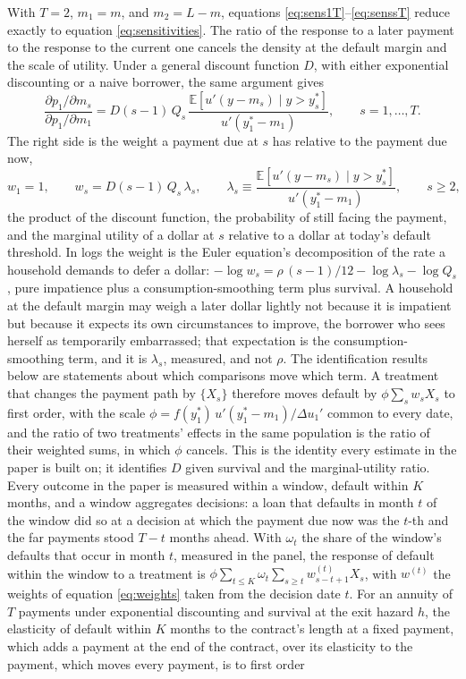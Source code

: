 With $T = 2$, $m_1 = m$, and $m_2 = L - m$, equations \eqref{eq:sens1T}--\eqref{eq:senssT} reduce exactly to equation \eqref{eq:sensitivities}. The ratio of the response to a later payment to the response to the current one cancels the density at the default margin and the scale of utility. Under a general discount function $D$, with either exponential discounting or a naive borrower, the same argument gives
\begin{equation}\label{eq:curveT}
\frac{\partial p_1/\partial m_s}{\partial p_1/\partial m_1} = D(s-1)\, Q_s\, \frac{\mathbb{E}[u'(y-m_s) \mid y > y_s^*]}{u'(y_1^* - m_1)}, \qquad s = 1, \dots, T.
\end{equation}
The right side is the weight a payment due at $s$ has relative to the payment due now,
\begin{equation}\label{eq:weights}
w_1 = 1, \qquad w_s = D(s-1)\,Q_s\,\lambda_s, \qquad \lambda_s \equiv \frac{\mathbb{E}[u'(y - m_s) \mid y > y_s^*]}{u'(y_1^* - m_1)}, \qquad s \ge 2,
\end{equation}
the product of the discount function, the probability of still facing the payment, and the marginal utility of a dollar at $s$ relative to a dollar at today's default threshold. In logs the weight is the Euler equation's decomposition of the rate a household demands to defer a dollar: $-\log w_s = \rho\,(s-1)/12 - \log\lambda_s - \log Q_s$, pure impatience plus a consumption-smoothing term plus survival. A household at the default margin may weigh a later dollar lightly not because it is impatient but because it expects its own circumstances to improve, the borrower who sees herself as temporarily embarrassed; that expectation is the consumption-smoothing term, and it is $\lambda_s$, measured, and not $\rho$. The identification results below are statements about which comparisons move which term. A treatment that changes the payment path by $\{X_s\}$ therefore moves default by $\phi\sum_s w_s X_s$ to first order, with the scale $\phi = f(y_1^*)\,u'(y_1^* - m_1)/\Delta u_1'$ common to every date, and the ratio of two treatments' effects in the same population is the ratio of their weighted sums, in which $\phi$ cancels. This is the identity every estimate in the paper is built on; it identifies $D$ given survival and the marginal-utility ratio. Every outcome in the paper is measured within a window, default within $K$ months, and a window aggregates decisions: a loan that defaults in month $t$ of the window did so at a decision at which the payment due now was the $t$-th and the far payments stood $T - t$ months ahead. With $\omega_t$ the share of the window's defaults that occur in month $t$, measured in the panel, the response of default within the window to a treatment is $\phi\sum_{t \le K}\omega_t\sum_{s \ge t} w^{(t)}_{s-t+1} X_s$, with $w^{(t)}$ the weights of equation \eqref{eq:weights} taken from the decision date $t$. For an annuity of $T$ payments under exponential discounting and survival at the exit hazard $h$, the elasticity of default within $K$ months to the contract's length at a fixed payment, which adds a payment at the end of the contract, over its elasticity to the payment, which moves every payment, is to first order
